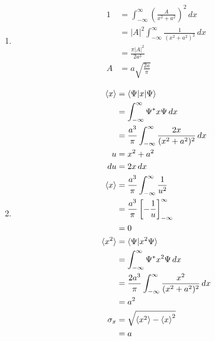 \documentclass{article}
\begin{document}
\subsection{}

\begin{enumerate}
  \item

        \begin{align*}
          1 & = \int_{-\infty}^\infty \left( \frac{A}{x^2 + a^2} \right)^2 \,d x \\
            & = |A|^2 \int_{-\infty}^\infty \frac{1}{(x^2 + a^2)^2} \,d x        \\
            & = \frac{\pi |A|^2}{2 a^3}                                          \\
          A & = a \sqrt{\frac{2 a}{\pi}}
        \end{align*}

  \item

        \begin{align*}
          \braket{x}   & = \braket{\Psi | x | \Psi}                                                \\
                       & = \int_{-\infty}^\infty \Psi^* x \Psi \,d x                               \\
                       & = \frac{a^3}{\pi} \int_{-\infty}^\infty \frac{2 x}{(x^2 + a^2)^2} \,d x   \\
          u            & = x^2 + a^2                                                               \\
          d u          & = 2 x \,d x                                                               \\
          \braket{x}   & = \frac{a^3}{\pi} \int_{-\infty}^\infty \frac{1}{u^2}                     \\
                       & = \frac{a^3}{\pi} \left[ -\frac{1}{u} \right]_{-\infty}^\infty            \\
                       & = 0                                                                       \\
          \braket{x^2} & = \braket{\Psi | x^2 \Psi}                                                \\
                       & = \int_{-\infty}^\infty \Psi^* x^2 \Psi \,d x                             \\
                       & = \frac{2 a^3}{\pi} \int_{-\infty}^\infty \frac{x^2}{(x^2 + a^2)^2} \,d x \\
                       & = a^2                                                                     \\
          \sigma_x     & = \sqrt{\braket{x^2} - \braket{x}^2}                                      \\
                       & = a
        \end{align*}


\end{enumerate}
\end{document}
